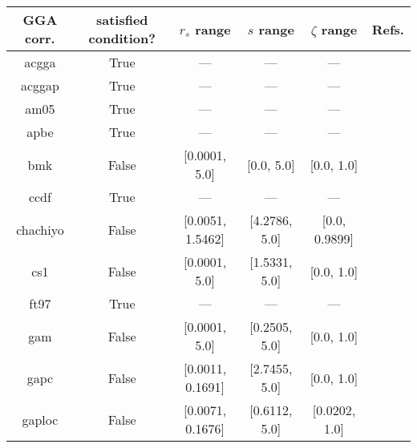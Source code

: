 \begin{tabular}{|c|c|c|c|c|l|}
\hline
     GGA corr. &  satisfied condition? &      $r_s$ range &        $s$ range & $\zeta$ range  &                                                          Refs. \\ \hline
         acgga &                  True &              --- &              --- &            --- &                        \cite{Cancio2018_084116,Burke2014_4834} \\ \hline
        acggap &                  True &              --- &              --- &            --- &                        \cite{Cancio2018_084116,Burke2014_4834} \\ \hline
          am05 &                  True &              --- &              --- &            --- &                 \cite{Armiento2005_085108,Mattsson2008_084714} \\ \hline
          apbe &                  True &              --- &              --- &            --- &                                   \cite{Constantin2011_186406} \\ \hline
           bmk &                 False &    [0.0001, 5.0] &       [0.0, 5.0] &     [0.0, 1.0] &                                          \cite{Boese2004_3405} \\ \hline
          ccdf &                  True &              --- &              --- &            --- &                                      \cite{Margraf2019_244116} \\ \hline
      chachiyo &                 False & [0.0051, 1.5462] &    [4.2786, 5.0] &  [0.0, 0.9899] &                                     \cite{Chachiyo2020_112669} \\ \hline
           cs1 &                 False &    [0.0001, 5.0] &    [1.5331, 5.0] &     [0.0, 1.0] &                          \cite{Handy2002_5411,Proynov2006_436} \\ \hline
          ft97 &                  True &              --- &              --- &            --- &                         \cite{Filatov1997_603,Filatov1997_847} \\ \hline
           gam &                 False &    [0.0001, 5.0] &    [0.2505, 5.0] &     [0.0, 1.0] &                                            \cite{Yu2015_12146} \\ \hline
          gapc &                 False & [0.0011, 0.1691] &    [2.7455, 5.0] &     [0.0, 1.0] &                                        \cite{Fabiano2014_2016} \\ \hline
        gaploc &                 False & [0.0071, 0.1676] &    [0.6112, 5.0] &  [0.0202, 1.0] &                                        \cite{Fabiano2014_2016} \\ \hline

\end{tabular}
